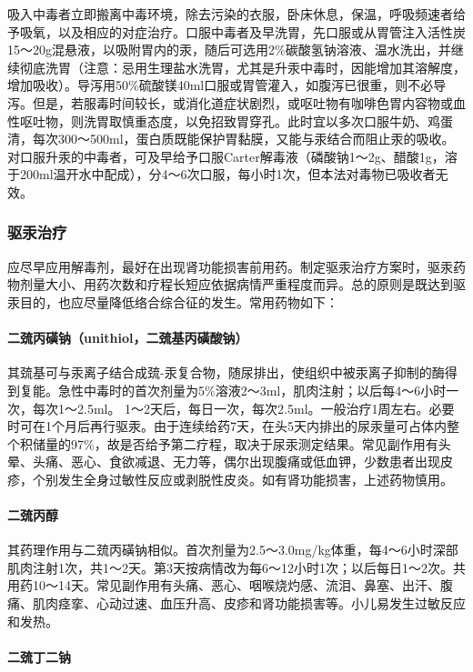 吸入中毒者立即搬离中毒环境，除去污染的衣服，卧床休息，保温，呼吸频速者给予吸氧，以及相应的对症治疗。口服中毒者及早洗胃，先口服或从胃管注入活性炭15～20g混悬液，以吸附胃内的汞，随后可选用2\%碳酸氢钠溶液、温水洗出，并继续彻底洗胃（注意：忌用生理盐水洗胃，尤其是升汞中毒时，因能增加其溶解度，增加吸收）。导泻用50\%硫酸镁40ml口服或胃管灌入，如腹泻已很重，则不必导泻。但是，若服毒时间较长，或消化道症状剧烈，或呕吐物有咖啡色胃内容物或血性呕吐物，则洗胃取慎重态度，以免招致胃穿孔。此时宜以多次口服牛奶、鸡蛋清，每次300～500ml，蛋白质既能保护胃黏膜，又能与汞结合而阻止汞的吸收。对口服升汞的中毒者，可及早给予口服Carter解毒液（磷酸钠1～2g、醋酸1g，溶于200ml温开水中配成），分4～6次口服，每小时1次，但本法对毒物已吸收者无效。

\subsubsection{驱汞治疗}

应尽早应用解毒剂，最好在出现肾功能损害前用药。制定驱汞治疗方案时，驱汞药物剂量大小、用药次数和疗程长短应依据病情严重程度而异。总的原则是既达到驱汞目的，也应尽量降低络合综合征的发生。常用药物如下：

\paragraph{二巯丙磺钠（unithiol，二巯基丙磺酸钠）}

其巯基可与汞离子结合成巯-汞复合物，随尿排出，使组织中被汞离子抑制的酶得到复能。急性中毒时的首次剂量为5\%溶液2～3ml，肌肉注射；以后每4～6小时一次，每次1～2.5ml。
1～2天后，每日一次，每次2.5ml。一般治疗1周左右。必要时可在1个月后再行驱汞。由于连续给药7天，在头5天内排出的尿汞量可占体内整个积储量的97\%，故是否给予第二疗程，取决于尿汞测定结果。常见副作用有头晕、头痛、恶心、食欲减退、无力等，偶尔出现腹痛或低血钾，少数患者出现皮疹，个别发生全身过敏性反应或剥脱性皮炎。如有肾功能损害，上述药物慎用。

\paragraph{二巯丙醇}

其药理作用与二巯丙磺钠相似。首次剂量为2.5～3.0mg/kg体重，每4～6小时深部肌肉注射1次，共1～2天。第3天按病情改为每6～12小时1次；以后每日1～2次。共用药10～14天。常见副作用有头痛、恶心、咽喉烧灼感、流泪、鼻塞、出汗、腹痛、肌肉痉挛、心动过速、血压升高、皮疹和肾功能损害等。小儿易发生过敏反应和发热。

\paragraph{二巯丁二钠}

